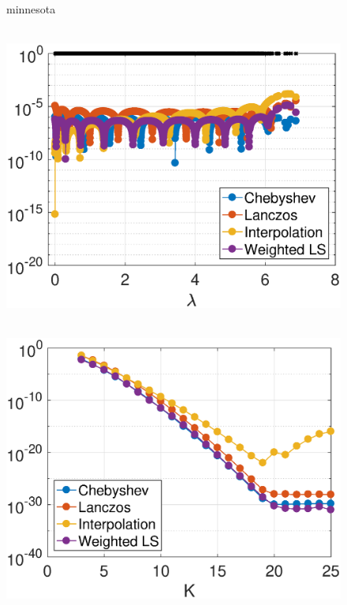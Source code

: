 \documentclass{article}
\begin{document}
\begin{figure}[bth]
\begin{minipage}[m]{0.44\linewidth}
\end{minipage}\\
\begin{minipage}[m]{0.1\linewidth}
\centerline{\small{minnesota}}
\end{minipage}
\begin{minipage}[m]{0.44\linewidth}
\centerline{~~\includegraphics[width=.95\linewidth]{fig_minnesota_deg10}}
\end{minipage}
\begin{minipage}[m]{0.44\linewidth}
\centerline{~~\includegraphics[width=.95\linewidth]{fig_minnesota_err_const_b}}
\end{minipage}\\
\begin{minipage}[m]{0.1\linewidth}

\end{minipage}
\end{figure}
\end{document}
